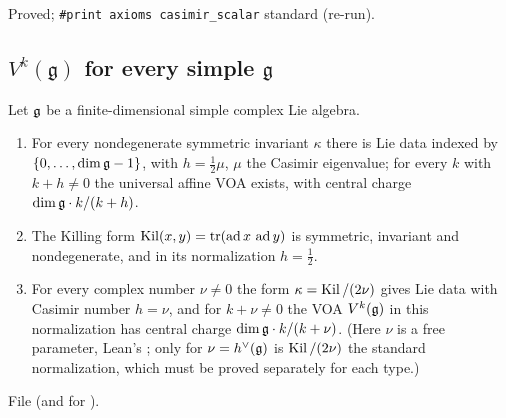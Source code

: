 \begin{status}
Proved; \texttt{\#print axioms casimir\_scalar} standard (re-run).
\end{status}

\subsection{\texorpdfstring{$V^k(\mathfrak g)$}{V\^{}k(g)} for every simple \texorpdfstring{$\mathfrak g$}{g}}

\begin{theorem}\label{l23:thm:simpleaffine}
Let $\mathfrak g$ be a finite-dimensional simple complex Lie algebra.
\begin{enumerate}
\item For every nondegenerate symmetric invariant $\kappa$ there is Lie data indexed by $\{0,\dots,\dim\mathfrak g-1\}$, with
  $h=\frac12\mu$, $\mu$ the Casimir eigenvalue; for every $k$ with $k+h\ne0$ the universal affine VOA exists, with central
  charge $\dim\mathfrak g\cdot k/(k+h)$.
\item The Killing form $\operatorname{Kil}(x,y)=\operatorname{tr}(\operatorname{ad} x\,\operatorname{ad} y)$ is symmetric, invariant and nondegenerate, and in its
  normalization $h=\tfrac12$.
\item For every complex number $\nu\neq0$ the form $\kappa=\operatorname{Kil}/(2\nu)$ gives Lie data with Casimir number $h=\nu$, and for
  $k+\nu\neq0$ the VOA $V^k(\mathfrak g)$ in this normalization has central charge $\dim\mathfrak g\cdot k/(k+\nu)$. (Here $\nu$ is a free
  parameter, Lean's ; only for $\nu=h^\vee(\mathfrak g)$ is $\operatorname{Kil}/(2\nu)$ the standard normalization, which must be proved
  separately for each type.)
\end{enumerate}
\end{theorem}
\noindent File  (and
 for ).

